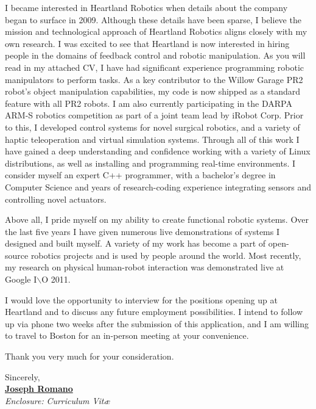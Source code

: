 \documentclass[11pt]{article}
\begin{document}
I became interested in Heartland Robotics when details about the company began to surface in 2009. Although these details have been sparse, I believe the mission and technological approach of Heartland Robotics aligns closely with my own research. I was excited to see that Heartland is now interested in hiring people in the domains of feedback control and robotic manipulation. As you will read in my attached CV, I have had significant experience programming robotic manipulators to perform tasks. As a key contributor to the Willow Garage PR2 robot's object manipulation capabilities,  my code is now shipped as a standard feature with all PR2 robots. I am also currently participating in the DARPA ARM-S robotics competition as part of a joint team lead by iRobot Corp. Prior to this, I developed control systems for novel surgical robotics, and a variety of haptic teleoperation and virtual simulation systems. Through all of this work I have gained a deep understanding and confidence working with a variety of Linux distributions, as well as installing and programming real-time environments. I consider myself an expert C++ programmer, with a bachelor's degree in Computer Science and years of research-coding experience integrating sensors and controlling novel actuators. %

Above all, I pride myself on my ability to create functional robotic systems. Over the last five years I have given numerous live demonstrations of systems I designed and built myself. A variety of my work has become a part of open-source robotics projects and is used by people around the world. Most recently, my research on physical human-robot interaction was demonstrated live at Google I$\backslash$O 2011.


I would love the opportunity to interview for the positions opening up at Heartland and to discuss any future employment possibilities. I intend to follow up via phone two weeks after the submission of this application, and I am willing to travel to Boston for an in-person meeting at your convenience.

Thank you very much for your consideration.
  
Sincerely,\\[2em] %
%
{\bfseries \href{http://www.seas.upenn.edu/~jrom}{Joseph Romano}}\\
%
\vfill%
{\slshape Enclosure:}
{\slshape Curriculum Vit\ae{}}
\end{document}
